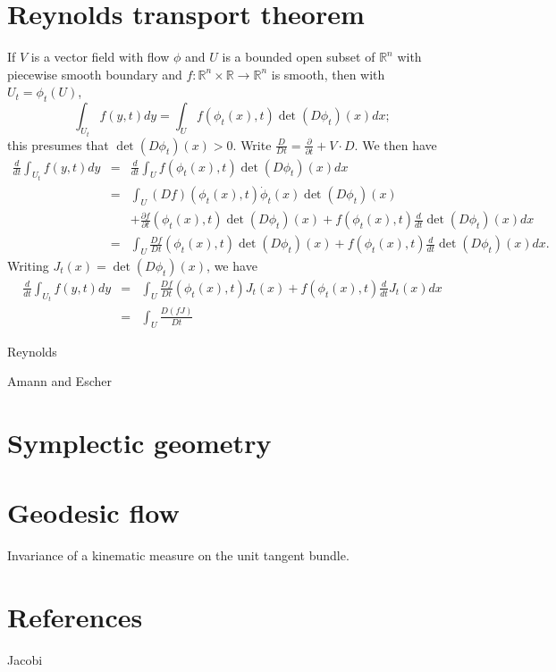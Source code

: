 \documentclass{article}
\begin{document}
\section{Reynolds transport theorem}
If $V$ is a vector field with flow $\phi$ and $U$ is a bounded open subset of $\mathbb{R}^n$ with piecewise smooth boundary and $f:\mathbb{R}^n \times \mathbb{R} \to 
\mathbb{R}^n$ is smooth, then with $U_t=\phi_t(U)$,
\[
\int_{U_t} f(y,t) dy = \int_U f(\phi_t(x),t) \det (D\phi_t)(x) dx;
\]
this presumes that $\det (D\phi_t)(x)>0$. Write $\frac{D}{Dt} = \frac{\partial}{\partial t} + V \cdot D$. 
We then have
\begin{eqnarray*}
\frac{d}{dt} \int_{U_t} f(y,t) dy& =& \frac{d}{dt}   \int_U f(\phi_t(x),t) \det (D\phi_t)(x) dx\\
& =&
\int_U (D f)(\phi_t(x),t) \dot{\phi}_t(x) \det (D\phi_t)(x) \\
&&+ \frac{\partial f}{\partial t}(\phi_t(x),t) \det (D\phi_t)(x)+f(\phi_t(x),t) \frac{d}{dt} \det(D\phi_t)(x) dx\\
&=&\int_U \frac{Df}{Dt}(\phi_t(x),t)  \det (D\phi_t)(x) +f(\phi_t(x),t) \frac{d}{dt} \det(D\phi_t)(x) dx.
\end{eqnarray*}
Writing $J_t(x) = \det (D\phi_t)(x)$, we have
\begin{eqnarray*}
\frac{d}{dt} \int_{U_t} f(y,t) dy&=&\int_U \frac{Df}{Dt}(\phi_t(x),t) J_t(x) +f(\phi_t(x),t) \frac{d}{dt}J_t(x) dx\\
&=&\int_U \frac{D(f J)}{Dt} 
\end{eqnarray*}


Reynolds \cite[pp.~12--13, art. 14]{reynolds}



Amann and Escher \cite[p.~425, Theorem 2.11]{amann}



\section{Symplectic geometry}



\section{Geodesic flow}
Invariance of a kinematic measure on the unit tangent bundle.


\section{References}
Jacobi \cite[p.~93]{jacobi}
\end{document}
